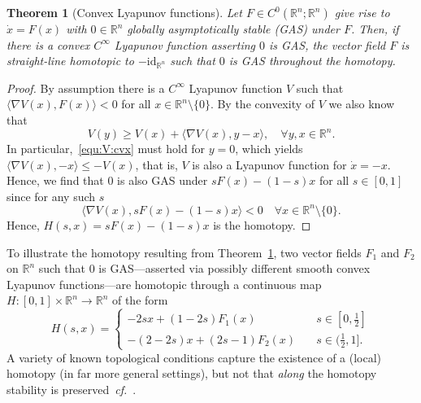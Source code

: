\documentclass[letterpaper, 10 pt, conference]{ieeeconf}  %
\theoremstyle{mystyle}
\newtheorem{theorem}{Theorem}[section]
\begin{document}
\begin{theorem}[Convex Lyapunov functions]
\label{thm:cvx:Lyap}
    Let $F\in C^{0}(\mathbb{R}^n;\mathbb{R}^n)$ give rise to $\dot{x}=F(x)$ with $0\in \mathbb{R}^n$ globally asymptotically stable (GAS) under $F$. Then, if there is a convex $C^{\infty}$ Lyapunov function asserting $0$ is GAS, the vector field $F$ is straight-line homotopic to $-\mathrm{id}_{\mathbb{R}^n}$ such that $0$ is GAS throughout the homotopy.
\end{theorem}
\begin{proof}
    {By assumption there is a $C^{\infty}$ Lyapunov function $V$ such that $\langle \nabla V(x),F(x) \rangle <0$ for all $x\in \mathbb{R}^n\setminus\{0\}$. By the convexity of $V$ we also know that
    \begin{equation}
        \label{equ:V:cvx}
        V(y)\geq V(x) + \langle \nabla V(x),y-x \rangle,\quad \forall y,x\in \mathbb{R}^n.
    \end{equation}
    In particular,~\eqref{equ:V:cvx} must hold for $y=0$, which yields $\langle \nabla V(x),-x\rangle \leq- V(x)$, that is, $V$ is also a Lyapunov function for $\dot{x}=-x$. 
    Hence, we find that $0$ is also GAS under $sF(x)-(1-s)x$ for all $s\in [0,1]$ since for any such $s$
    \begin{equation*}
        \langle \nabla V(x), sF(x)-(1-s)x\rangle <0 \quad \forall x\in \mathbb{R}^n\setminus \{0\}.
    \end{equation*}
Hence, $H(s,x)=sF(x)-(1-s)x$ is the homotopy.} 
\end{proof}
To illustrate the homotopy resulting from Theorem~\ref{thm:cvx:Lyap}, two vector fields $F_1$ and $F_2$ on $\mathbb{R}^n$ such that $0$ is GAS---asserted via possibly different smooth convex Lyapunov functions---are homotopic through a continuous map $H:[0,1]\times \mathbb{R}^n\to \mathbb{R}^n$ of the form
\begin{equation*}
    H(s,x) = \begin{cases}
-2sx +(1-2s)F_1(x) \quad & s\in [0,\tfrac{1}{2}]\\
-(2-2s)x+(2s-1)F_2(x) \quad & s\in (\tfrac{1}{2},1].
    \end{cases}
\end{equation*}
A variety of known topological conditions capture the existence of a (local) homotopy (in far more general settings), but not that \textit{along} the homotopy stability is preserved~\textit{cf.}~\cite{ref:kvalheim2022obstructions}. 
\end{document}
